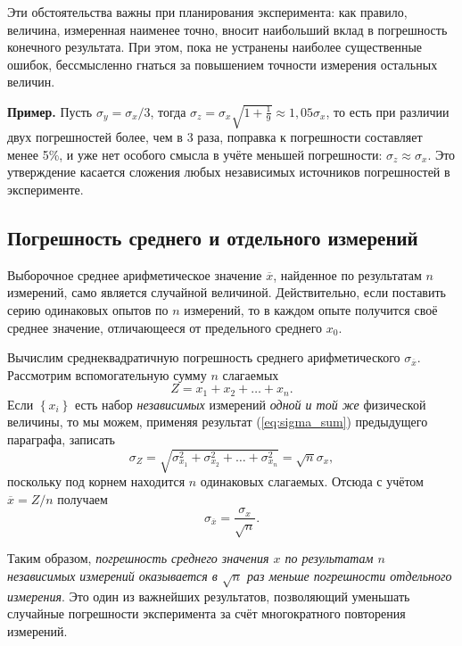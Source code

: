 \documentclass[10pt]{article}
\begin{document}
Эти обстоятельства важны при планирования эксперимента: как правило,
величина, измеренная наименее точно, вносит наибольший вклад в погрешность
конечного результата. При этом, пока не устранены наиболее существенные
ошибок, бессмысленно гнаться за повышением точности измерения остальных
величин.

\textbf{\footnotesize{}Пример.}{\footnotesize{} Пусть $\sigma_{y}=\sigma_{x}/3$,
тогда $\sigma_{z}=\sigma_{x}\sqrt{1+\frac{1}{9}}\approx1{,}05\sigma_{x}$,
то есть при различии двух погрешностей более, чем в 3 раза, поправка
к погрешности составляет менее 5\%, и уже нет особого смысла в учёте
меньшей погрешности: $\sigma_{z}\approx\sigma_{x}$. Это утверждение
касается сложения любых независимых источников погрешностей в эксперименте.}{\footnotesize\par}

\subsection{Погрешность среднего и отдельного измерений\label{subsec:average}}

Выборочное среднее арифметическое значение $\overline{x}$, найденное
по результатам $n$ измерений, само является случайной величиной.
Действительно, если поставить серию одинаковых опытов по $n$ измерений,
то в каждом опыте получится своё среднее значение, отличающееся от
предельного среднего $x_{0}$.

Вычислим среднеквадратичную погрешность среднего арифметического $\sigma_{\overline{x}}$.
Рассмотрим вспомогательную сумму $n$ слагаемых 
\[
Z=x_{1}+x_{2}+\ldots+x_{n}.
\]
Если $\left\{ x_{i}\right\} $ есть набор \emph{независимых} измерений
\emph{одной и той же} физической величины, то мы можем, применяя результат
(\ref{eq:sigma_sum}) предыдущего параграфа, записать
\[
\sigma_{Z}=\sqrt{\sigma_{x_{1}}^{2}+\sigma_{x_{2}}^{2}+\ldots+\sigma_{x_{n}}^{2}}=\sqrt{n}\sigma_{x},
\]
поскольку под корнем находится $n$ одинаковых слагаемых. Отсюда с
учётом $\overline{x}=Z/n$ получаем
\begin{equation}
\boxed{{\sigma_{\overline{x}}=\frac{\sigma_{x}}{\sqrt{n}}}}.\label{eq:sigma_avg}
\end{equation}

Таким образом, \emph{погрешность среднего значения $x$ по результатам
$n$ независимых измерений оказывается в $\sqrt{n}$ раз меньше погрешности
отдельного измерения}. Это один из важнейших результатов, позволяющий
уменьшать случайные погрешности эксперимента за счёт многократного
повторения измерений.
\end{document}
